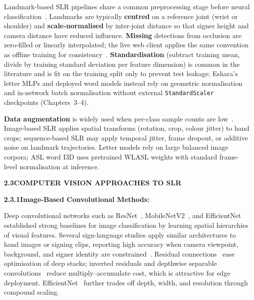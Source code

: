 \noindent Landmark-based SLR pipelines share a common preprocessing stage before neural classification~\cite{zhang2020mediapipe,deng2024skeleton,adaloglou2022comprehensive}. Landmarks are typically \textbf{centred} on a reference joint (wrist or shoulder) and \textbf{scale-normalised} by inter-joint distance so that signer height and camera distance have reduced influence. \textbf{Missing} detections from occlusion are zero-filled or linearly interpolated; the live web client applies the same convention as offline training for consistency~\cite{zhang2020mediapipe}. \textbf{Standardisation} (subtract training mean, divide by training standard deviation per feature dimension) is common in the literature and is fit on the training split only to prevent test leakage; Eshara's letter MLPs and deployed word models instead rely on geometric normalisation and in-network batch normalisation without external \texttt{StandardScaler} checkpoints (Chapters~3--4).\par\vspace{0.3cm}

\noindent \textbf{Data augmentation} is widely used when per-class sample counts are low~\cite{perez2017augmentation,sidig2021karsl}. Image-based SLR applies spatial transforms (rotation, crop, colour jitter) to hand crops; sequence-based SLR may apply temporal jitter, frame dropout, or additive noise on landmark trajectories. Letter models rely on large balanced image corpora; ASL word I3D uses pretrained WLASL weights with standard frame-level normalisation at inference.\par\vspace{0.3cm}
\clearpage
\noindent\textbf{2.3\quad COMPUTER VISION APPROACHES TO SLR}\par
{}
\vspace{0.2cm}

\noindent\textbf{2.3.1\quad Image-Based Convolutional Methods:}\par
{}
\vspace{0.3cm}

\noindent Deep convolutional networks such as ResNet~\cite{he2016deep}, MobileNetV2~\cite{sandler2018mobilenetv2,howard2017mobilenets}, and EfficientNet~\cite{tan2019efficientnet} established strong baselines for image classification by learning spatial hierarchies of visual features. Several sign-language studies apply similar architectures to hand images or signing clips, reporting high accuracy when camera viewpoint, background, and signer identity are constrained~\cite{rastgoo2021survey,pigou2018sign,huang2018attention}. Residual connections~\cite{he2016deep} ease optimisation of deep stacks; inverted residuals and depthwise separable convolutions~\cite{sandler2018mobilenetv2} reduce multiply--accumulate cost, which is attractive for edge deployment. EfficientNet~\cite{tan2019efficientnet} further trades off depth, width, and resolution through compound scaling.\par\vspace{0.2cm}

